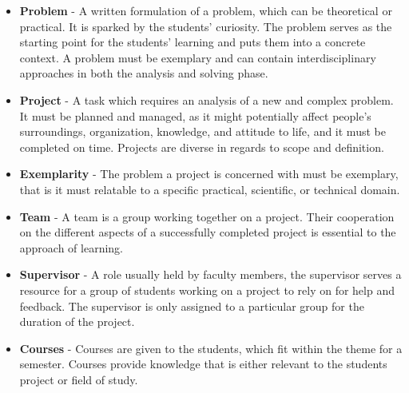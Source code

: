 \begin{itemize}
	\item \textbf{Problem} - A written formulation of a problem, which can be theoretical or practical. 
	It is sparked by the students' curiosity. 
	The problem serves as the starting point for the students' learning and puts them into a concrete context. 
	A problem must be exemplary and can contain interdisciplinary approaches	in both the analysis and solving phase.
	\item \textbf{Project} - A task which requires an analysis of a new and complex problem. It must be planned and managed, as it might potentially affect people's surroundings, organization, knowledge, and attitude to life, and it must be completed on time. Projects are diverse in regards to scope and definition.
	\item \textbf{Exemplarity} - The problem a project is concerned with must be exemplary, that is it must relatable to a specific practical, scientific, or technical domain.
	\item \textbf{Team} - A team is a group working together on a project. 
	Their cooperation on the different aspects of a successfully completed project is essential to the approach of learning.
	\item \textbf{Supervisor} - A role usually held by faculty members, the supervisor serves a resource for a group of students working on a project to rely on for help and feedback. 
	The supervisor is only assigned to a particular group for the duration of the project. 
	\item \textbf{Courses} - Courses are given to the students, which fit within the theme for a semester. 
	Courses provide knowledge that is either relevant to the students project or field of study.
\end{itemize}

